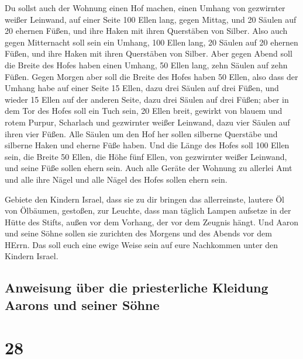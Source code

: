  Du sollst auch der Wohnung einen Hof machen, einen Umhang
von gezwirnter weißer Leinwand, auf einer Seite 100 Ellen lang, gegen
Mittag,  und 20 Säulen auf 20 ehernen Füßen, und ihre
Haken mit ihren Querstäben von Silber.  Also auch gegen
Mitternacht soll sein ein Umhang, 100 Ellen lang, 20 Säulen auf 20
ehernen Füßen, und ihre Haken mit ihren Querstäben von Silber.
 Aber gegen Abend soll die Breite des Hofes haben einen
Umhang, 50 Ellen lang, zehn Säulen auf zehn Füßen.  Gegen
Morgen aber soll die Breite des Hofes haben 50 Ellen, 
also dass der Umhang habe auf einer Seite 15 Ellen, dazu drei Säulen auf
drei Füßen,  und wieder 15 Ellen auf der anderen Seite,
dazu drei Säulen auf drei Füßen;  aber in dem Tor des
Hofes soll ein Tuch sein, 20 Ellen breit, gewirkt von blauem und rotem
Purpur, Scharlach und gezwirnter weißer Leinwand, dazu vier Säulen auf
ihren vier Füßen.  Alle Säulen um den Hof her sollen
silberne Querstäbe und silberne Haken und eherne Füße haben.
 Und die Länge des Hofes soll 100 Ellen sein, die Breite
50 Ellen, die Höhe fünf Ellen, von gezwirnter weißer Leinwand, und seine
Füße sollen ehern sein.  Auch alle Geräte der Wohnung zu
allerlei Amt und alle ihre Nägel und alle Nägel des Hofes sollen ehern
sein.

 Gebiete den Kindern Israel, dass sie zu dir bringen das
allerreinste, lautere Öl von Ölbäumen, gestoßen, zur Leuchte, dass man
täglich Lampen aufsetze  in der Hütte des Stifts, außen
vor dem Vorhang, der vor dem Zeugnis hängt. Und Aaron und seine Söhne
sollen sie zurichten des Morgens und des Abends vor dem HErrn. Das soll
euch eine ewige Weise sein auf eure Nachkommen unter den Kindern Israel.

\hypertarget{anweisung-uxfcber-die-priesterliche-kleidung-aarons-und-seiner-suxf6hne}{%
\subsection{Anweisung über die priesterliche Kleidung Aarons und seiner
Söhne}\label{anweisung-uxfcber-die-priesterliche-kleidung-aarons-und-seiner-suxf6hne}}

\hypertarget{section-27}{%
\section{28}\label{section-27}}

